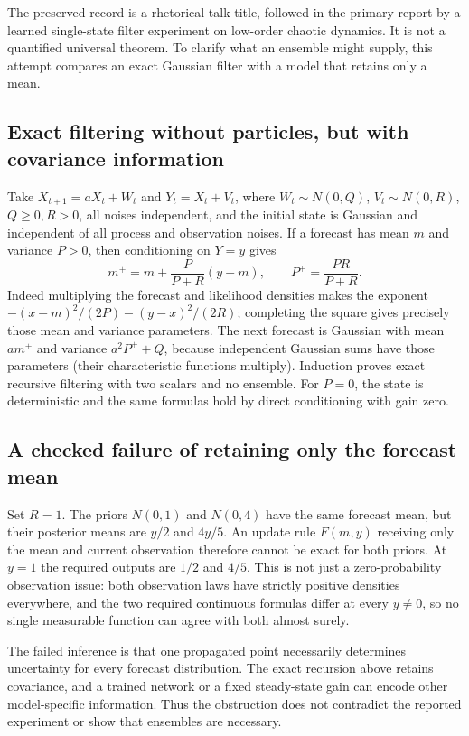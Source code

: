 \documentclass[11pt]{article}
\begin{document}
The preserved record is a rhetorical talk title, followed in the primary report by a learned single-state filter experiment on low-order chaotic dynamics. It is not a quantified universal theorem. To clarify what an ensemble might supply, this attempt compares an exact Gaussian filter with a model that retains only a mean.
\subsection{Exact filtering without particles, but with covariance information}
Take $X_{t+1}=aX_t+W_t$ and $Y_t=X_t+V_t$, where $W_t\sim N(0,Q)$, $V_t\sim N(0,R)$, $Q\ge0,R>0$, all noises independent, and the initial state is Gaussian and independent of all process and observation noises. If a forecast has mean $m$ and variance $P>0$, then conditioning on $Y=y$ gives
\[
 m^+=m+\frac{P}{P+R}(y-m),\qquad P^+=\frac{PR}{P+R}.
\]
Indeed multiplying the forecast and likelihood densities makes the exponent
$-(x-m)^2/(2P)-(y-x)^2/(2R)$; completing the square gives precisely those mean and variance parameters. The next forecast is Gaussian with mean $am^+$ and variance $a^2P^++Q$, because independent Gaussian sums have those parameters (their characteristic functions multiply). Induction proves exact recursive filtering with two scalars and no ensemble. For $P=0$, the state is deterministic and the same formulas hold by direct conditioning with gain zero.
\subsection{A checked failure of retaining only the forecast mean}
Set $R=1$. The priors $N(0,1)$ and $N(0,4)$ have the same forecast mean, but their posterior means are $y/2$ and $4y/5$. An update rule $F(m,y)$ receiving only the mean and current observation therefore cannot be exact for both priors. At $y=1$ the required outputs are $1/2$ and $4/5$. This is not just a zero-probability observation issue: both observation laws have strictly positive densities everywhere, and the two required continuous formulas differ at every $y\ne0$, so no single measurable function can agree with both almost surely.

The failed inference is that one propagated point necessarily determines uncertainty for every forecast distribution. The exact recursion above retains covariance, and a trained network or a fixed steady-state gain can encode other model-specific information. Thus the obstruction does not contradict the reported experiment or show that ensembles are necessary.
\end{document}
